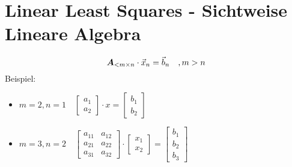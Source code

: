\section{Linear Least Squares - Sichtweise Lineare Algebra}
\begin{equation}
\boldsymbol {A}_{<m\times n}\cdot\vec{x}_{n} = \vec{b}_{n}\quad,m>n
\end{equation}
Beispiel:
\begin{itemize}
\item $m=2,n=1\quad\begin{bmatrix}
a_1 \\ a_2
\end{bmatrix}\cdot x = \begin{bmatrix}
b_1 \\ b_2
\end{bmatrix}$
\item $m=3,n=2\quad\begin{bmatrix}
a_{11} & a_{12} \\ a_{21} & a_{22} \\ a_{31} & a_{32}
\end{bmatrix}\cdot \begin{bmatrix}
x_1 \\ x_2
\end{bmatrix} = \begin{bmatrix}
b_1 \\ b_2 \\ b_3
\end{bmatrix}$
\end{itemize}

